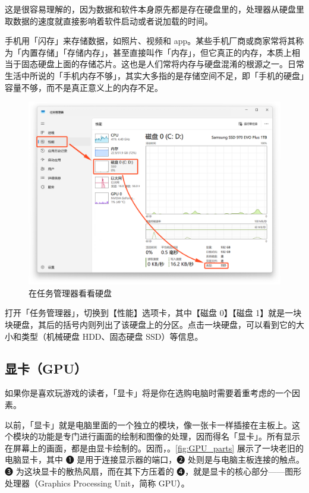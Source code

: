 这是很容易理解的，因为数据和软件本身原先都是存在硬盘里的，处理器从硬盘里取数据的速度就直接影响着软件启动或者说加载的时间。

\begin{note}
  手机用「闪存」来存储数据，如照片、视频和 app。某些手机厂商或商家常将其称为「内置存储」「存储内存」，甚至直接叫作「内存」，但它真正的内存，本质上相当于固态硬盘上面的存储芯片。这也是人们常将内存与硬盘混淆的根源之一。日常生活中所说的「手机内存不够」，其实大多指的是存储空间不足，即「手机的硬盘」容量不够，而不是真正意义上的内存不足。
\end{note}

\begin{figure}[htb!]
  \centering
  \includegraphics[width=.65\textwidth]{assets/basic/Check_disk_status.png}
  \caption{在任务管理器看看硬盘}
  \label{fig:Check_disk_status}
\end{figure}

打开「任务管理器」，切换到【性能】选项卡，其中【磁盘 0】【磁盘 1】就是一块块硬盘，其后的括号内则列出了该硬盘上的分区。点击一块硬盘，可以看到它的大小和类型（机械硬盘 HDD、固态硬盘 SSD）等信息。

\subsection{显卡（GPU）}

如果你是喜欢玩游戏的读者，「显卡」将是你在选购电脑时需要着重考虑的一个因素。

以前，「显卡」就是电脑里面的一个独立的模块，像一张卡一样插接在主板上。这个模块的功能是专门进行画面的绘制和图像的处理，因而得名「显卡」。所有显示在屏幕上的画面，都是由显卡绘制的。因而，。\autoref{fig:GPU_parts} 展示了一块老旧的电脑显卡，其中 ➊ 是用于连接显示器的端口，➋ 处则是与电脑主板连接的触点。➌ 为这块显卡的散热风扇，而在其下方压着的 ➍，就是显卡的核心部分——图形处理器（Graphics Processing Unit，简称 GPU）。

